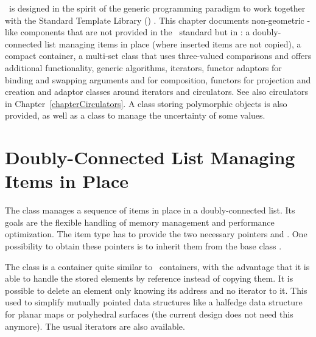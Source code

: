 



\minitoc

\cgal\ is designed in the spirit of the generic programming paradigm
to work together with the Standard Template Library (\stl)
\cite{cgal:ansi-is14882-98,cgal:a-gps-98}. This chapter documents non-geometric
\stl-like components that are not provided in the \stl\ standard but
in \cgal: a doubly-connected list managing items in place (where
inserted items are not copied), a compact container, a multi-set class that
uses three-valued comparisons and offers additional functionality,
generic algorithms, iterators, functor adaptors for binding and swapping
arguments and for composition, functors for projection and creation and
adaptor classes around iterators and circulators. See also circulators in
Chapter~\ref{chapterCirculators}.  A class storing polymorphic objects
is also provided, as well as a class to manage the uncertainty of some values.

\section{Doubly-Connected List Managing Items in Place}

The class  manages a
sequence of items in place in a doubly-connected list. Its goals are
the flexible handling of memory management and performance
optimization. The item type has to provide the two necessary
pointers  and . One possibility
to obtain these pointers is to inherit them from the base class
.

The class  is a container quite similar
to \stl\ containers, with the advantage that it is able to handle the
stored elements by reference instead of copying them. It is possible
to delete an element only knowing its address and no iterator to it.
This used to simplify mutually pointed data structures like a halfedge
data structure for planar maps or polyhedral surfaces (the current design
does not need this anymore). The usual iterators are also available.

